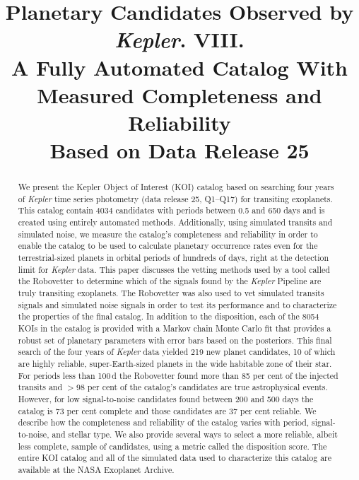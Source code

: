 \documentclass[apj,twocolappendix,numberedappendix]{emulateapj}
\renewcommand{\_}{\discretionary{\underscore}{}{\underscore}}  %
\newcommand\Kepler{\textit{Kepler}}
\begin{document}

\title{Planetary Candidates Observed by \Kepler. VIII.\\
A Fully Automated Catalog With Measured Completeness and Reliability\\Based on Data Release 25 }



\begin{abstract}
We present the Kepler Object of Interest (KOI) catalog based on searching four years of \Kepler{} time series photometry (data release 25, Q1--Q17) for transiting exoplanets. This catalog contain 4034 candidates with periods between 0.5 and 650 days and is created using entirely automated methods. Additionally, using simulated transits and simulated noise, we measure the catalog's completeness and reliability in order to enable the catalog to be used to calculate planetary occurrence rates even for the terrestrial-sized planets in orbital periods of hundreds of days, right at the detection limit for \Kepler{} data.  This paper discusses the vetting methods used by a tool called the Robovetter to determine which of the \ntces{} signals found by the \Kepler{} Pipeline \citep{Twicken2016} are truly transiting exoplanets.  The Robovetter was also used to vet simulated transits signals and simulated noise signals in order to test its performance and to characterize the properties of the final catalog. In addition to the disposition, each of the 8054 KOIs in the catalog is provided with a Markov chain Monte Carlo fit that provides a robust set of planetary parameters with error bars based on the posteriors. This final search of the four years of \Kepler{} data yielded 219 new planet candidates, 10 of which are highly reliable, super-Earth-sized planets in the wide habitable zone of their star. For periods less than 100\,d the Robovetter found more than 85 per cent of the injected transits and $>$98 per cent of the catalog's candidates are true astrophysical events.   However, for low signal-to-noise candidates found between 200 and 500 days the catalog is 73 per cent complete and those candidates are 37 per cent reliable. We describe how the completeness and reliability of the catalog varies with period, signal-to-noise, and stellar type. We also provide several ways to select a more reliable, albeit less complete, sample of candidates, using a metric called the disposition score. The entire KOI catalog and all of the simulated data used to characterize this catalog are available at the NASA Exoplanet Archive.


\end{abstract}
\end{document}
